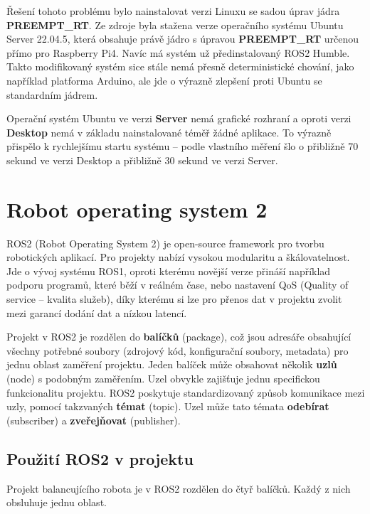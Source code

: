 Řešení tohoto problému bylo nainstalovat verzi Linuxu se sadou úprav jádra \textbf{PREEMPT\_RT}. Ze zdroje \cite{RT_source} byla stažena verze operačního systému Ubuntu Server 22.04.5, která obsahuje právě jádro s úpravou \textbf{PREEMPT\_RT} určenou přímo pro Raspberry Pi4. Navíc má systém už předinstalovaný ROS2 Humble. Takto modifikovaný systém sice stále nemá přesně deterministické chování, jako například platforma Arduino, ale jde o výrazně zlepšení proti Ubuntu se standardním jádrem. \cite{RT}

Operační systém Ubuntu ve verzi \textbf{Server} nemá grafické rozhraní a oproti verzi \textbf{Desktop} nemá v základu nainstalované téměř žádné aplikace. To výrazně přispělo k rychlejšímu startu systému -- podle vlastního měření šlo o přibližně 70 sekund ve verzi Desktop a přibližně 30 sekund ve verzi Server. \cite{server}

\section{Robot operating system 2}
ROS2 (Robot Operating System 2) je open-source framework pro tvorbu robotických aplikací. Pro projekty nabízí vysokou modularitu a škálovatelnost. Jde o vývoj systému ROS1, oproti kterému novější verze přináší například podporu programů, které běží v reálném čase, nebo nastavení QoS (Quality of service -- kvalita služeb), díky kterému si lze pro přenos dat v projektu zvolit mezi garancí dodání dat a nízkou latencí.

Projekt v ROS2 je rozdělen do \textbf{balíčků} (package), což jsou adresáře obsahující všechny potřebné soubory (zdrojový kód, konfigurační soubory, metadata) pro jednu oblast zaměření projektu. Jeden balíček může obsahovat několik \textbf{uzlů} (node) s podobným zaměřením. Uzel obvykle zajišťuje jednu specifickou funkcionalitu projektu. ROS2 poskytuje standardizovaný způsob komunikace mezi uzly, pomocí takzvaných \textbf{témat} (topic). Uzel může tato témata \textbf{odebírat} (subscriber) a \textbf{zveřejňovat} (publisher).

\subsection*{Použití ROS2 v projektu}
Projekt balancujícího robota je v ROS2 rozdělen do čtyř balíčků. Každý z nich obsluhuje jednu oblast. 


